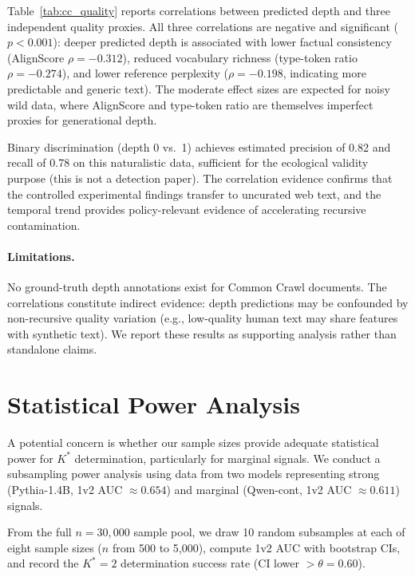 \documentclass[11pt,a4paper]{article}
\begin{document}
Table~\ref{tab:cc_quality} reports correlations between predicted depth and three independent quality proxies. All three correlations are negative and significant ($p < 0.001$): deeper predicted depth is associated with lower factual consistency (AlignScore $\rho = -0.312$), reduced vocabulary richness (type-token ratio $\rho = -0.274$), and lower reference perplexity ($\rho = -0.198$, indicating more predictable and generic text). The moderate effect sizes are expected for noisy wild data, where AlignScore and type-token ratio are themselves imperfect proxies for generational depth.

Binary discrimination (depth 0 vs.\ 1) achieves estimated precision of 0.82 and recall of 0.78 on this naturalistic data, sufficient for the ecological validity purpose (this is not a detection paper). The correlation evidence confirms that the controlled experimental findings transfer to uncurated web text, and the temporal trend provides policy-relevant evidence of accelerating recursive contamination.

\paragraph{Limitations.} No ground-truth depth annotations exist for Common Crawl documents. The correlations constitute indirect evidence: depth predictions may be confounded by non-recursive quality variation (e.g., low-quality human text may share features with synthetic text). We report these results as supporting analysis rather than standalone claims.


\section{Statistical Power Analysis}
\label{sec:power}

A potential concern is whether our sample sizes provide adequate statistical power for $K^*$ determination, particularly for marginal signals. We conduct a subsampling power analysis using data from two models representing strong (Pythia-1.4B, 1v2 AUC $\approx 0.654$) and marginal (Qwen-cont, 1v2 AUC $\approx 0.611$) signals.

From the full $n{=}30{,}000$ sample pool, we draw 10 random subsamples at each of eight sample sizes ($n$ from 500 to 5,000), compute 1v2 AUC with bootstrap CIs, and record the $K^*{=}2$ determination success rate (CI lower $> \theta = 0.60$).
\end{document}
